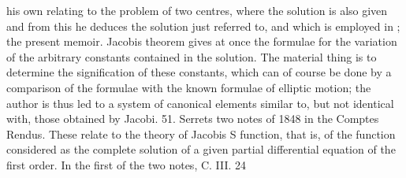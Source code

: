 \documentclass[11pt,a4paper]{book}
\begin{document}
his own relating to the problem of two centres, where the solution is also given and
from this he deduces the solution just referred to, and which is employed in ; the
present memoir. Jacobis theorem gives at once the formulae for the variation of the
arbitrary constants contained in the solution. The material thing is to determine the
signification of these constants, which can of course be done by a comparison of the
formulae with the known formulae of elliptic motion; the author is thus led to a
system of canonical elements similar to, but not identical with, those obtained by
Jacobi.
51. Serrets two notes of 1848 in the Comptes Rendus. These relate to the theory
of Jacobis S function, that is, of the function considered as the complete solution of
a given partial differential equation of the first order. In the first of the two notes,
C. III. 24


\end{document}
